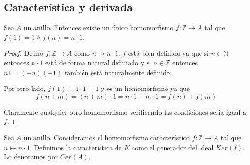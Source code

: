 \subsection{Característica y derivada}

\begin{proposition}
Sea $A$ un anillo. Entonces existe un único homomorfismo $f:\mathbb{Z} \to A$ tal que $f(1) = 1 \land f(n) = n \cdot 1$.
\end{proposition}
\begin{proof}
Defino $f: \mathbb{Z} \to A$ como $n \to n \cdot 1$. $f$ está bien definido ya que si $n \in \mathbb{N}$ entonces $n \cdot 1$ está de forma natural definiado y si $n \in \mathbb{Z}$ entonces $n1 = (-n)(-1)$ también está naturalmente definido. 

Por otro lado, $f(1) = 1 \cdot 1 = 1$ y es un homomorfismo ya que $$f(n+m) = (n+m) \cdot 1 = n \cdot 1 + m \cdot 1 = f(n) + f(m)$$

Claramente cualquier otro homomorfismo verificando las condiciones sería igual a $f$. 
\end{proof}

\begin{definition}
Sea $A$ un anillo. Consideramos el homomorfismo característico $f:\mathbb{Z} \to A$ tal que $n \mapsto n \cdot 1$. Definimos la característica de $K$ como el generador del ideal $Ker(f)$. Lo denotamos por $Car(A)$. 
\end{definition}

